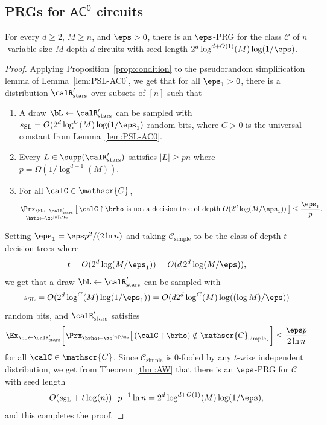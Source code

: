 \documentclass{toc}
\theoremstyle{plain}
\newcommand{\acz}{\mathsf{AC^0}}
\newcommand{\uhr}{\upharpoonright}
\newcommand{\simple}{\mathrm{simple}}
\newcommand{\stars}{\mathrm{stars}}
\newcommand{\SL}{\mathrm{SL}}
\begin{document}
\subsection{PRGs for $\acz$ circuits} 


\begin{theorem}
For every $d\ge 2$, $M \geq n$, and $\eps > 0$, there is an $\eps$-PRG for the class $\mathscr{C}$ of $n$-variable size-$M$ depth-$d$ circuits with seed length $2^d\log^{d+O(1)}(M)\log(1/\eps)$. 
\end{theorem}


\begin{proof} 
Applying Proposition~\ref{prop:condition} to the pseudorandom simplification lemma of Lemma~\ref{lem:PSL-AC0}, we get that for all $\eps_1 > 0$, there is a distribution $\calR'_\stars$ over subsets of $[n]$ such that 
\begin{enumerate} 

\item A draw $\bL\leftarrow\calR'_\stars$ can be sampled with $s_\SL = O( 2^{d} \log^{C}(M) \log(1/\eps_1)$ random bits, where $C > 0$ is the universal constant from Lemma~\ref{lem:PSL-AC0}.
%
%

\item Every $L \in \supp(\calR'_\stars)$ satisfies $|L| \ge pn$ where $p = \Omega(1/\log^{d-1}(M))$. 
\item For all $\calC \in \mathscr{C}$,  
\[ \mathop{\Prx_{\bL\leftarrow\calR'_\stars}}_{\brho\leftarrow\zo^{[n]\setminus \bL}}\big[\,\text{$\calC \uhr \brho$ is not a decision tree of depth $O(2^d\log(M/\eps_1))$}\,\big] \le \frac{\eps_1}{p}. \]
\end{enumerate}
Setting $\eps_1 = \eps p^2/(2\ln n)$ and taking $\mathscr{C}_\simple$ to be the class of depth-$t$ decision trees where 
\[ t = O(2^d \log(M/\eps_1)) = O(d \,2^d\log(M/\eps)), \]
we get that a draw $\bL \leftarrow\calR'_\stars$ can be sampled with  
\[ s_\SL = O(2^d \log^C(M) \log(1/\eps_1) )=  O(d 2^d \log^C(M) \log((\log M)/\eps)) \]
random bits, and $\calR'_\stars$ satisfies
 \[ \Ex_{\bL\leftarrow\calR'_{\stars}}\bigg[ \Prx_{\brho\leftarrow\zo^{[n]\setminus \bL}}\big[\, (\calC \uhr \brho) \notin \mathscr{C}_\simple\big] \bigg]  \le \frac{\eps p}{2\ln n} \] 
for all $\calC \in \mathscr{C}$. Since $\mathscr{C}_\simple$ is $0$-fooled by any $t$-wise independent distribution, we get from Theorem~\ref{thm:AW} that there is an $\eps$-PRG for $\mathscr{C}$ with seed length 
 \[ O(s_\SL + t \log(n)) \cdot p^{-1}\ln n  = 2^d\log^{d+O(1)}(M)\log(1/\eps),\]
 and this completes the proof.
%
\end{proof} 
\end{document}
